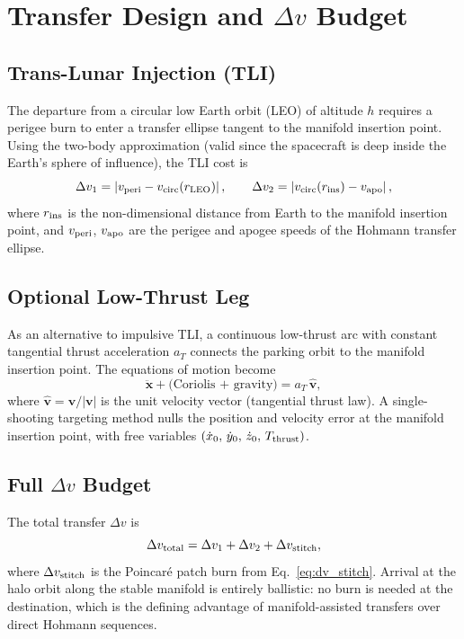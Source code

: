 \documentclass[12pt, a4paper]{article}
\newcommand{\dv}{\Delta v}
\newcommand{\bfx}{\bm{x}}
\begin{document}
\section{Transfer Design and $\Delta v$ Budget}
\label{sec:transfer}

\subsection{Trans-Lunar Injection (TLI)}

The departure from a circular low Earth orbit (LEO) of altitude $h$
requires a perigee burn to enter a transfer ellipse tangent to the
manifold insertion point.
Using the two-body approximation (valid since the spacecraft is deep inside
the Earth's sphere of influence), the TLI cost is
\begin{equation}
  \dv_1 = \left| v_{\rm peri} - v_{\rm circ}(r_{\rm LEO}) \right|,\qquad
  \dv_2 = \left| v_{\rm circ}(r_{\rm ins}) - v_{\rm apo} \right|,
\end{equation}
where $r_{\rm ins}$ is the non-dimensional distance from Earth to the
manifold insertion point, and $v_{\rm peri}$, $v_{\rm apo}$ are the
perigee and apogee speeds of the Hohmann transfer ellipse.

\subsection{Optional Low-Thrust Leg}

As an alternative to impulsive TLI, a continuous low-thrust arc with
constant tangential thrust acceleration $a_T$ connects the parking orbit to
the manifold insertion point.
The equations of motion become
\begin{equation}
  \ddot{\bfx} + \text{(Coriolis + gravity)} = a_T\,\hat{\mathbf{v}},
\end{equation}
where $\hat{\mathbf{v}} = \mathbf{v}/|\mathbf{v}|$ is the unit velocity
vector (tangential thrust law).
A single-shooting targeting method nulls the position and velocity error
at the manifold insertion point, with free variables
$(\dot{x}_0,\,\dot{y}_0,\,\dot{z}_0,\,T_{\rm thrust})$.

\subsection{Full $\Delta v$ Budget}

The total transfer $\Delta v$ is
\begin{equation}
  \dv_{\rm total} = \dv_1 + \dv_2 + \dv_{\rm stitch},
  \label{eq:dv_total}
\end{equation}
where $\dv_{\rm stitch}$ is the Poincaré patch burn from
Eq.~\eqref{eq:dv_stitch}.
Arrival at the halo orbit along the stable manifold is entirely ballistic:
no burn is needed at the destination, which is the defining advantage of
manifold-assisted transfers over direct Hohmann sequences.
\end{document}

